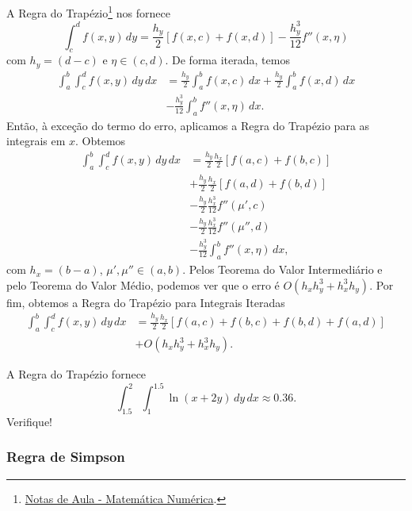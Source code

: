 A Regra do Trapézio\footnote{\href{https://phkonzen.github.io/notas/MatematicaNumerica/cap_integr_sec_NC.html}{Notas de Aula - Matemática Numérica}.} nos fornece
\begin{equation}
  \int_c^d f(x,y)\,dy = \frac{h_y}{2}\left[f(x,c) + f(x,d)\right] - \frac{h_y^3}{12}f''(x,\eta)
\end{equation}
com $h_y = (d-c)$ e $\eta\in (c,d)$. De forma iterada, temos
\begin{align}
  \int_a^b\int_c^d f(x,y)\,dy\,dx &= \frac{h_y}{2}\int_a^b f(x,c)\,dx + \frac{h_y}{2}\int_a^bf(x,d)\,dx\\
                                  &- \frac{h_y^3}{12}\int_a^b f''(x,\eta)\,dx.
\end{align}
Então, à exceção do termo do erro, aplicamos a Regra do Trapézio para as integrais em $x$. Obtemos
\begin{align}
  \int_a^b\int_c^d f(x,y)\,dy\,dx &= \frac{h_y}{2}\frac{h_x}{2}\left[f(a,c) + f(b,c)\right]\\
                                  &+ \frac{h_y}{2}\frac{h_x}{2}\left[f(a,d) + f(b,d)\right]\\
                                  &-\frac{h_y}{2}\frac{h_x^3}{12}f''(\mu',c)\\
                                  &-\frac{h_y}{2}\frac{h_x^3}{12}f''(\mu'',d)\\
                                  &-\frac{h_y^3}{12}\int_a^b f''(x,\eta)\,dx,
\end{align}
com $h_x = (b-a)$, $\mu',\mu''\in (a,b)$. Pelos Teorema do Valor Intermediário e pelo Teorema do Valor Médio, podemos ver que o erro é $O(h_xh_y^3 + h_x^3h_y)$. Por fim, obtemos a Regra do Trapézio para Integrais Iteradas
\begin{align}
  \int_a^b\int_c^d f(x,y)\,dy\,dx &= \frac{h_y}{2}\frac{h_x}{2}\left[f(a,c)+f(b,c)+f(b,d)+f(a,d)\right]\\
                                  &+ O(h_xh_y^3 + h_x^3h_y).
\end{align}

\begin{ex}
  A Regra do Trapézio fornece
  \begin{equation}
    \int_{1.5}^{2}\int_{1}^{1.5}\ln(x + 2y)\,dy\,dx \approx 0.36.
  \end{equation}
  Verifique!
\end{ex}

\subsubsection{Regra de Simpson}

